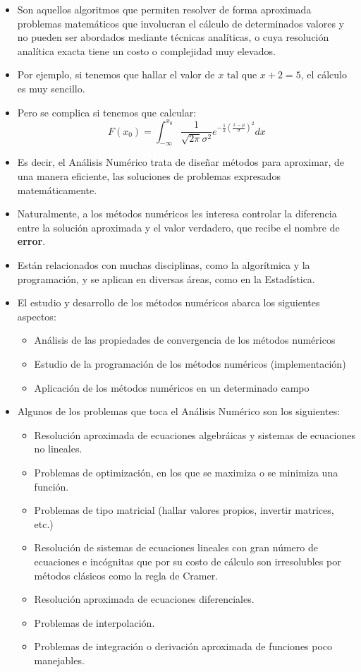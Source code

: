 \documentclass[]{book}
\providecommand{\tightlist}{%
  \setlength{\itemsep}{0pt}\setlength{\parskip}{0pt}}
\begin{document}
\begin{itemize}
\item
  Son aquellos algoritmos que permiten resolver de forma aproximada problemas matemáticos que involucran el cálculo de determinados valores y no pueden ser abordados mediante técnicas analíticas, o cuya resolución analítica exacta tiene un costo o complejidad muy elevados.
\item
  Por ejemplo, si tenemos que hallar el valor de \(x \text{ tal que } x + 2 = 5\), el cálculo es muy sencillo.
\item
  Pero se complica si tenemos que calcular:
  \[ F(x_0) = \int_{-\infty}^{x_0} \frac{1}{\sqrt{2\pi}\sigma^2}e^{-\frac{1}{2} \left( {\frac{x-\mu}{\sigma}}\right)^2}dx\]
\item
  Es decir, el Análisis Numérico trata de diseñar métodos para aproximar, de una
  manera eficiente, las soluciones de problemas expresados matemáticamente.
\item
  Naturalmente, a los métodos numéricos les interesa controlar la diferencia entre la solución aproximada y el valor verdadero, que recibe el nombre de \textbf{error}.
\item
  Están relacionados con muchas disciplinas, como la algorítmica y la programación, y se aplican en diversas áreas, como en la Estadística.
\item
  El estudio y desarrollo de los métodos numéricos abarca los siguientes aspectos:

  \begin{itemize}
  \tightlist
  \item
    Análisis de las propiedades de convergencia de los métodos numéricos
  \item
    Estudio de la programación de los métodos numéricos (implementación)
  \item
    Aplicación de los métodos numéricos en un determinado campo
  \end{itemize}
\item
  Algunos de los problemas que toca el Análisis Numérico son los siguientes:

  \begin{itemize}
  \tightlist
  \item
    Resolución aproximada de ecuaciones algebráicas y sistemas de ecuaciones no lineales.
  \item
    Problemas de optimización, en los que se maximiza o se minimiza una función.
  \item
    Problemas de tipo matricial (hallar valores propios, invertir matrices, etc.)
  \item
    Resolución de sistemas de ecuaciones lineales con gran número de ecuaciones e incógnitas que por su costo de cálculo son irresolubles por métodos clásicos como la regla de Cramer.
  \item
    Resolución aproximada de ecuaciones diferenciales.
  \item
    Problemas de interpolación.
  \item
    Problemas de integración o derivación aproximada de funciones poco manejables.
  \end{itemize}
\end{itemize}
\end{document}
